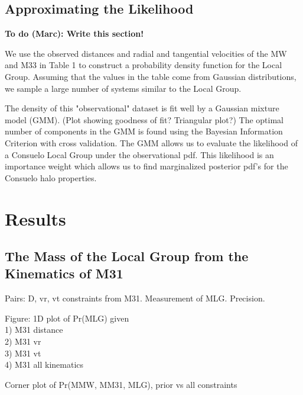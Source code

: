 \documentclass[iop,apj]{emulateapj}
\newcommand{\todo}[2]{{\bf To do (#1): #2}}
\begin{document}

\subsection{Approximating the Likelihood}
\label{sec:lhood}

\todo{Marc}{Write this section!}

We use the observed distances and radial and tangential velocities of the MW and M33 in Table 1 to construct a probability density function for the Local Group. Assuming that the values in the table come from Gaussian distributions, we sample a large number of systems similar to the Local Group. 

The density of this "observational" dataset is fit well by a Gaussian mixture model (GMM). (Plot showing goodness of fit? Triangular plot?) The optimal number of components in the GMM is found using the Bayesian Information Criterion with cross validation. The GMM allows us to evaluate the likelihood of a Consuelo Local Group under the observational pdf. This likelihood is an importance weight which allows us to find marginalized posterior pdf's for the Consuelo halo properties.


\section{Results}
\label{sec:results}


\subsection{The Mass of the Local Group from the Kinematics of M31}
\label{sec:results:LGmass}

Pairs: D, vr, vt constraints from M31. 
Measurement of  MLG. Precision. 

Figure: 1D plot of Pr(MLG) given \\
  1) M31 distance\\
  2) M31 vr\\
  3) M31 vt\\
  4) M31 all kinematics

Corner plot of Pr(MMW, MM31, MLG), prior vs all constraints
\end{document}
